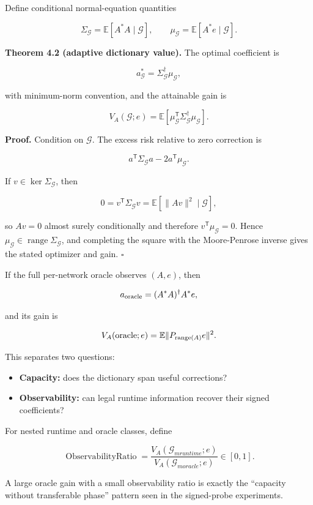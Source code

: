 \documentclass[
  10pt,
]{article}
\providecommand{\tightlist}{%
  \setlength{\itemsep}{0pt}\setlength{\parskip}{0pt}}
\begin{document}
Define conditional normal-equation quantities

\[
\Sigma_{\mathcal G}
=
\mathbb E[A^*A\mid\mathcal G],
\qquad
\mu_{\mathcal G}
=
\mathbb E[A^*e\mid\mathcal G].
\]

\textbf{Theorem 4.2 (adaptive dictionary value).} The optimal
coefficient is

\[
a^*_{\mathcal G}
=
\Sigma_{\mathcal G}^{\dagger}\mu_{\mathcal G},
\]

with minimum-norm convention, and the attainable gain is

\[
V_A(\mathcal G;e)
=
\mathbb E\left[
\mu_{\mathcal G}^{\mathsf T}
\Sigma_{\mathcal G}^{\dagger}
\mu_{\mathcal G}
\right].
\]

\textbf{Proof.} Condition on \(\mathcal G\). The excess risk relative to
zero correction is

\[
a^{\mathsf T}\Sigma_{\mathcal G}a
-2a^{\mathsf T}\mu_{\mathcal G}.
\]

If \(v\in\ker\Sigma_{\mathcal G}\), then

\[
0=v^{\mathsf T}\Sigma_{\mathcal G}v
=
\mathbb E[\|Av\|^2\mid\mathcal G],
\]

so \(Av=0\) almost surely conditionally and therefore
\(v^{\mathsf T}\mu_{\mathcal G}=0\). Hence
\(\mu_{\mathcal G}\in\operatorname{range}\Sigma_{\mathcal G}\), and
completing the square with the Moore-Penrose inverse gives the stated
optimizer and gain. \(\square\)

If the full per-network oracle observes \((A,e)\), then

\[
a_{\rm oracle}= (A^*A)^\dagger A^*e,
\]

and its gain is

\[
V_A({\rm oracle};e)
=
\mathbb E\|P_{\operatorname{range}(A)}e\|^2.
\]

This separates two questions:

\begin{itemize}
\tightlist
\item
  \textbf{Capacity:} does the dictionary span useful corrections?
\item
  \textbf{Observability:} can legal runtime information recover their
  signed coefficients?
\end{itemize}

For nested runtime and oracle classes, define

\[
\operatorname{ObservabilityRatio}
=
\frac{V_A(\mathcal G_{
m runtime};e)}
{V_A(\mathcal G_{
m oracle};e)}
\in[0,1].
\]

A large oracle gain with a small observability ratio is exactly the
``capacity without transferable phase'' pattern seen in the signed-probe
experiments.
\end{document}
